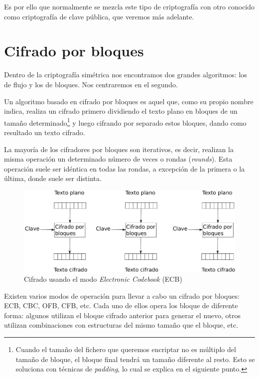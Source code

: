 Es por ello que normalmente se mezcla este tipo de criptografía con otro conocido como criptografía de clave pública, que veremos más adelante.


\section{Cifrado por bloques}

Dentro de la criptografía simétrica nos encontramos dos grandes algoritmos: los de flujo y los de bloques. Nos centraremos en el segundo.

Un algoritmo basado en cifrado por bloques es aquel que, como su propio nombre indica, realiza un cifrado primero dividiendo el texto plano en bloques de un tamaño determinado\footnote{Cuando el tamaño del fichero que queremos encriptar no es múltiplo del tamaño de bloque, el bloque final tendrá un tamaño diferente al resto. Esto se soluciona con técnicas de \emph{padding}, lo cual se explica en el siguiente punto.} y luego cifrando por separado estos bloques, dando como resultado un texto cifrado.

La mayoría de los cifradores por bloques son iterativos, es decir, realizan la misma operación un determinado número de veces o rondas (\emph{rounds}). Esta operación suele ser idéntica en todas las rondas, a excepción de la primera o la última, donde suele ser distinta.

\begin{figure}[ht]
  \centering
  \includegraphics[scale=0.5]{Figures/ECB}
  \decoRule
  \caption[\emph{Electronic Codebook} (ECB)]{Cifrado usando el modo \emph{Electronic Codebook} (ECB)}
  \label{fig:ECB}
\end{figure}

Existen varios modos de operación para llevar a cabo un cifrado por bloques: ECB, CBC, OFB, CFB, etc. Cada uno de ellos opera los bloque de diferente forma: algunos utilizan el bloque cifrado anterior para generar el nuevo, otros utilizan combinaciones con estructuras del mismo tamaño que el bloque, etc. \emph{\parencite{Reference21}}

